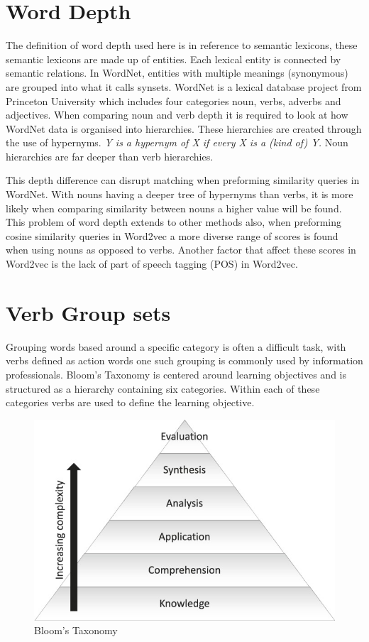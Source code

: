 \section{Word Depth} 
The definition of word depth used here is in reference to semantic lexicons, these semantic lexicons are made up of entities. Each lexical entity is connected by semantic relations. In WordNet, entities with multiple meanings (synonymous) are grouped into what it calls synsets. WordNet is a lexical database project from Princeton University which includes four categories noun, verbs, adverbs and adjectives. When comparing noun and verb depth it is required to look at how WordNet data is organised into hierarchies. These hierarchies are created through the use of hypernyms. \textit{Y is a hypernym of X if every X is a (kind of) Y.} Noun hierarchies are far deeper than verb hierarchies.

This depth difference can disrupt matching when preforming similarity queries in WordNet. With nouns having a deeper tree of hypernyms than verbs, it is more likely when comparing similarity between nouns a higher value will be found. This problem of word depth extends to other methods also, when preforming cosine similarity queries in Word2vec a more diverse range of scores is found when using nouns as opposed to verbs. Another factor that affect these scores in Word2vec is the lack of part of speech tagging (POS) in Word2vec.

\section{Verb Group sets}
Grouping words based around a specific category is often a difficult task, with verbs defined as action words one such grouping is commonly used by information professionals. Bloom's Taxonomy is centered around learning objectives and is structured as a hierarchy containing six categories. Within each of these categories verbs are used to define the learning objective.

\begin{figure}[H]
\centering
  \includegraphics[width=.9\textwidth]{images/bloom.jpg}
  \caption{Bloom's Taxonomy}
  \label{fig:bloom}
\end{figure}

